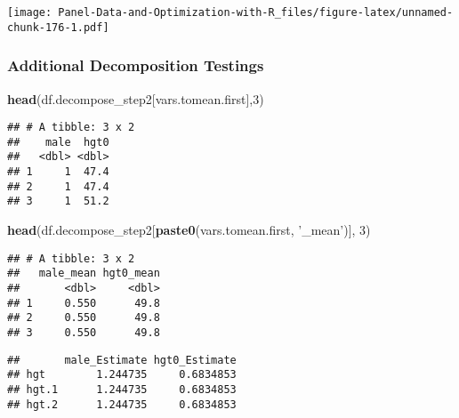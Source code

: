 \documentclass[
]{book}
\newenvironment{Shaded}{\begin{snugshade}}{\end{snugshade}}
\newcommand{\DecValTok}[1]{\textcolor[rgb]{0.00,0.00,0.81}{#1}}
\newcommand{\KeywordTok}[1]{\textcolor[rgb]{0.13,0.29,0.53}{\textbf{#1}}}
\newcommand{\NormalTok}[1]{#1}
\newcommand{\OperatorTok}[1]{\textcolor[rgb]{0.81,0.36,0.00}{\textbf{#1}}}
\newcommand{\StringTok}[1]{\textcolor[rgb]{0.31,0.60,0.02}{#1}}
\begin{document}
\texttt{[image: Panel-Data-and-Optimization-with-R\_files/figure-latex/unnamed-chunk-176-1.pdf]}

\hypertarget{additional-decomposition-testings}{%
\subsubsection{Additional Decomposition Testings}\label{additional-decomposition-testings}}

\begin{Shaded}
\begin{Highlighting}[]
\KeywordTok{head}\NormalTok{(df.decompose_step2[vars.tomean.first],}\DecValTok{3}\NormalTok{)}
\end{Highlighting}
\end{Shaded}

\begin{verbatim}
## # A tibble: 3 x 2
##    male  hgt0
##   <dbl> <dbl>
## 1     1  47.4
## 2     1  47.4
## 3     1  51.2
\end{verbatim}

\begin{Shaded}
\begin{Highlighting}[]
\KeywordTok{head}\NormalTok{(df.decompose_step2[}\KeywordTok{paste0}\NormalTok{(vars.tomean.first, }\StringTok{'_mean'}\NormalTok{)], }\DecValTok{3}\NormalTok{)}
\end{Highlighting}
\end{Shaded}

\begin{verbatim}
## # A tibble: 3 x 2
##   male_mean hgt0_mean
##       <dbl>     <dbl>
## 1     0.550      49.8
## 2     0.550      49.8
## 3     0.550      49.8
\end{verbatim}

\begin{Shaded}
\end{Shaded}

\begin{verbatim}
##       male_Estimate hgt0_Estimate
## hgt        1.244735     0.6834853
## hgt.1      1.244735     0.6834853
## hgt.2      1.244735     0.6834853
\end{verbatim}
\end{document}
